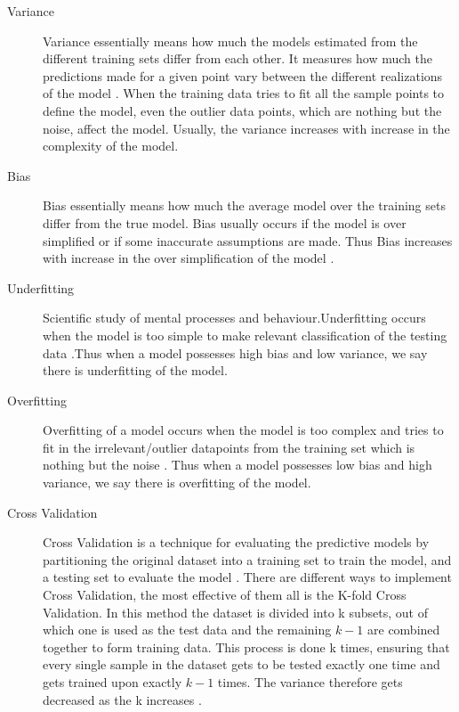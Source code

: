 \begin{description}
\item[Variance] Variance essentially means how much the models estimated from the different training sets differ from each other. It measures how much the predictions made for a given point vary between the different realizations of the model \cite{link17}. When the training data tries to fit all the sample points to define the model, even the outlier data points, which are nothing but the noise, affect the model. Usually, the variance increases with increase in the complexity of the model.
\item[Bias] Bias essentially means how much the average model over the training sets differ from the true model. Bias usually occurs if the model is over simplified or if some inaccurate assumptions are made. Thus Bias increases with increase in the over simplification of the model \cite{link17}.
\item[Underfitting] Scientific study of mental processes and behaviour.Underfitting occurs when the model is too simple to make relevant classification of the testing data \cite{link17}.Thus when a model possesses high bias and low variance, we say there is underfitting of the model.
\item[Overfitting] Overfitting of a model occurs when the model is too complex and tries to fit in the irrelevant/outlier datapoints from the training set which is nothing but the noise \cite{link17}. Thus when a model possesses low bias and high variance, we say there is overfitting of the model.
\item[Cross Validation]  Cross Validation is a technique for evaluating the predictive models by partitioning the original dataset into a training set to train the model, and a testing set to evaluate the model \cite{link16}. There are different ways to implement Cross Validation, the most effective of them all is the K-fold Cross Validation. In this method the dataset is divided into k subsets, out of which one is used as the test data and the remaining $k-1$ are combined together to form training data. This process is done k times, ensuring that every single sample in the dataset gets to be tested exactly one time and gets trained upon exactly $k-1$ times. The variance therefore gets decreased as the k increases \cite{link16}.
\end{description}

